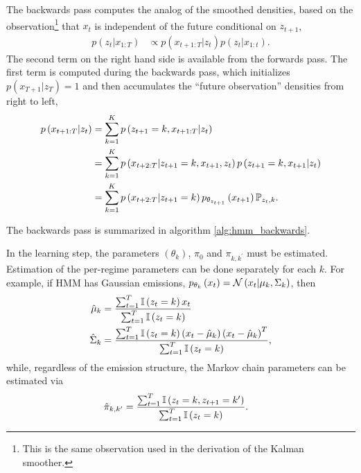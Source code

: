 \documentclass{article}
\begin{document}
The backwards pass computes the analog of the smoothed densities, based on the
observation\footnote{This is the same observation used in the derivation of the
  Kalman smoother.} that $x_{t}$ is independent of the future conditional on
$z_{t + 1}$,
\begin{align*}
  p\left(z_{t} \vert x_{1:T}\right) &\propto p\left(x_{t + 1:T} \vert z_{t}\right) p\left(z_{t} \vert x_{1:t}\right).
\end{align*}
The second term on the right hand side is available from the forwards pass. The
first term is computed during the backwards pass, which initializes $p\left(x_{T
  + 1} \vert z_{T}\right) = 1$ and then accumulates the ``future observation''
densities from right to left,
\begin{align*}
  p\left(x_{t + 1: T} \vert z_{t}\right) &= \sum_{k = 1}^{K} p\left(z_{t + 1} = k, x_{t + 1 : T} \vert z_{t}\right) \\
  &= \sum_{k = 1}^{K} p\left(x_{t + 2: T}\vert z_{t + 1} = k, x_{t + 1}, z_{t}\right) p\left(z_{t + 1} = k, x_{t + 1} \vert z_{t}\right) \\
  &= \sum_{k = 1}^{K} p\left(x_{t + 2:T}\vert z_{t + 1} = k\right)p_{\theta_{z_{t + 1}}}\left(x_{t + 1}\right) \P_{z_{t}, k}.
\end{align*}

The backwards pass is summarized in algorithm \ref{alg:hmm_backwards}.

In the learning step, the parameters $\left(\theta_{k}\right)$, $\pi_0$ and
$\pi_{k, k^{\prime}}$ must be estimated. Estimation of the per-regime parameters
can be done separately for each $k$. For example, if HMM has Gaussian emissions,
$p_{\theta_{k}}\left(x_{t}\right) = \Gsn\left(x_{t} \vert \mu_{k},
\Sigma_{k}\right)$, then
\begin{align*}
  \hat{\mu}_{k} &= \frac{\sum_{t = 1}^{T} \indic{z_{t} = k}x_{t}}{\sum_{t = 1}^{T}\indic{z_{t} = k}} \\
  \hat{\Sigma}_{k} &= \frac{\sum_{t = 1}^{T} \indic{z_{t} = k}\left(x_{t} - \hat{\mu}_{k}\right)\left(x_{t} - \hat{\mu}_{k}\right)^{T}}
      {\sum_{t = 1}^{T} \indic{z_{t} = k}},
\end{align*}
while, regardless of the emission structure, the Markov chain parameters can be
estimated via
\begin{align*}
  \hat{\pi}_{k, k^{\prime}} &= \frac{\sum_{t = 1}^{T} \indic{z_{t} = k, z_{t + 1} = k^{\prime}}}{\sum_{t = 1}^{T} \indic{z_{t} = k}}.
\end{align*}
\end{document}
